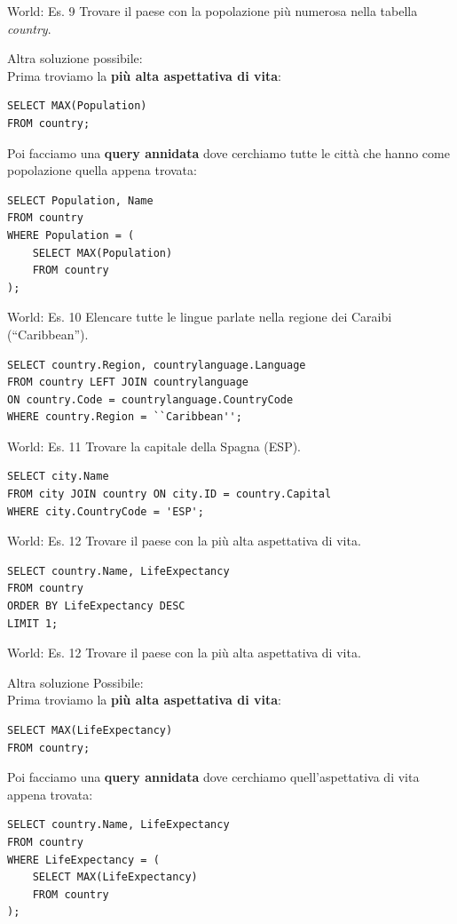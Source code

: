%
\begin{frame}[fragile]{World: Es. 9}
Trovare il paese con la popolazione pi\`u numerosa nella tabella \textit{country}.

Altra soluzione possibile:
\pause
\\Prima troviamo la \textbf{pi\`u alta aspettativa di vita}:
\begin{lstlisting}
SELECT MAX(Population)
FROM country;
\end{lstlisting}
\pause
Poi facciamo una \textbf{query annidata} dove cerchiamo tutte le citt\`a che hanno come popolazione quella appena trovata:
\begin{lstlisting}
SELECT Population, Name
FROM country
WHERE Population = (
    SELECT MAX(Population)
    FROM country
);
\end{lstlisting}
\end{frame}
%
\begin{frame}[fragile]{World: Es. 10}
Elencare tutte le lingue parlate nella regione dei Caraibi (``Caribbean''). 
\pause
\begin{lstlisting}
SELECT country.Region, countrylanguage.Language
FROM country LEFT JOIN countrylanguage
ON country.Code = countrylanguage.CountryCode
WHERE country.Region = ``Caribbean'';
\end{lstlisting}
\end{frame}
%
\begin{frame}[fragile]{World: Es. 11}
Trovare la capitale della Spagna (ESP).
\pause
\begin{lstlisting}
SELECT city.Name
FROM city JOIN country ON city.ID = country.Capital
WHERE city.CountryCode = 'ESP';
\end{lstlisting}
\end{frame}
%
\begin{frame}[fragile]{World: Es. 12}
Trovare il paese con la pi\`u alta aspettativa di vita.
\pause
\begin{lstlisting}
SELECT country.Name, LifeExpectancy
FROM country
ORDER BY LifeExpectancy DESC
LIMIT 1;
\end{lstlisting}
\end{frame}
%
\begin{frame}[fragile]{World: Es. 12}
Trovare il paese con la pi\`u alta aspettativa di vita.

Altra soluzione Possibile:
\pause
\\Prima troviamo la \textbf{pi\`u alta aspettativa di vita}:
\begin{lstlisting}
SELECT MAX(LifeExpectancy)
FROM country;
\end{lstlisting}
\pause
Poi facciamo una \textbf{query annidata} dove cerchiamo quell'aspettativa di vita appena trovata:
\begin{lstlisting}
SELECT country.Name, LifeExpectancy
FROM country
WHERE LifeExpectancy = (
    SELECT MAX(LifeExpectancy)
    FROM country
);
\end{lstlisting}
\end{frame}
